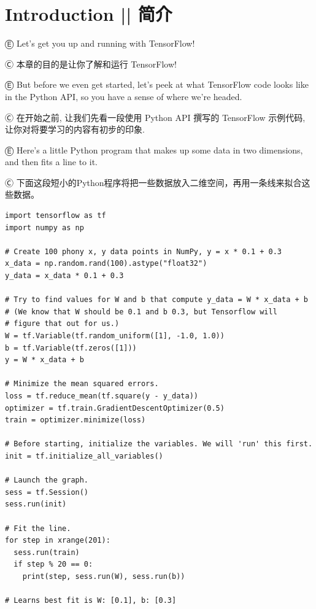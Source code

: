 

\section{Introduction  ||  简介}

Ⓔ \textcolor{etc}{Let's get you up and running with TensorFlow!}

Ⓒ 本章的目的是让你了解和运行 TensorFlow!

Ⓔ \textcolor{etc}{But before we even get started, let's peek at what TensorFlow code looks like in the Python API, so you have a sense of where we're headed.}

Ⓒ 在开始之前, 让我们先看一段使用 Python API 撰写的 TensorFlow 示例代码,
让你对将要学习的内容有初步的印象.

Ⓔ \textcolor{etc}{Here's a little Python program that makes up some data in two dimensions, and then fits a line to it.}

Ⓒ 下面这段短小的Python程序将把一些数据放入二维空间，再用一条线来拟合这些数据。

\begin{lstlisting}
import tensorflow as tf
import numpy as np

# Create 100 phony x, y data points in NumPy, y = x * 0.1 + 0.3
x_data = np.random.rand(100).astype("float32")
y_data = x_data * 0.1 + 0.3

# Try to find values for W and b that compute y_data = W * x_data + b
# (We know that W should be 0.1 and b 0.3, but Tensorflow will
# figure that out for us.)
W = tf.Variable(tf.random_uniform([1], -1.0, 1.0))
b = tf.Variable(tf.zeros([1]))
y = W * x_data + b

# Minimize the mean squared errors.
loss = tf.reduce_mean(tf.square(y - y_data))
optimizer = tf.train.GradientDescentOptimizer(0.5)
train = optimizer.minimize(loss)

# Before starting, initialize the variables. We will 'run' this first.
init = tf.initialize_all_variables()

# Launch the graph.
sess = tf.Session()
sess.run(init)

# Fit the line.
for step in xrange(201):
  sess.run(train)
  if step % 20 == 0:
    print(step, sess.run(W), sess.run(b))

# Learns best fit is W: [0.1], b: [0.3]
\end{lstlisting}

